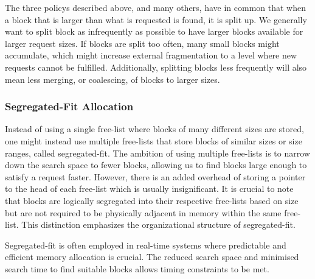 The three policys described above, and many others, have in common that when a block that is larger than what is requested is found, it is split up. We generally want to split block as infrequently as possible to have larger blocks available for larger request sizes. If blocks are split too often, many small blocks might accumulate, which might increase external fragmentation to a level where new requests cannot be fulfilled. Additionally, splitting blocks less frequently will also mean less merging, or coalescing, of blocks to larger sizes.

\subsubsection{Segregated-Fit Allocation}
Instead of using a single free-list where blocks of many different sizes are stored, one might instead use multiple free-lists that store blocks of similar sizes or size ranges, called segregated-fit. The ambition of using multiple free-lists is to narrow down the search space to fewer blocks, allowing us to find blocks large enough to satisfy a request faster. However, there is an added overhead of storing a pointer to the head of each free-list which is usually insignificant. It is crucial to note that blocks are logically segregated into their respective free-lists based on size but are not required to be physically adjacent in memory within the same free-list. This distinction emphasizes the organizational structure of segregated-fit.

Segregated-fit is often employed in real-time systems where predictable and efficient memory allocation is crucial. The reduced search space and minimised search time to find suitable blocks allows timing constraints to be met.


